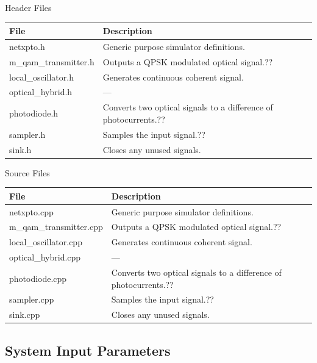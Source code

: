 Header Files
\begin{table}[H]
\centering
\begin{tabulary}{1.0\textwidth}{|L|L|}
\hline
\textbf{File}           & \textbf{Description}\\
\hline
netxpto.h               & Generic purpose simulator definitions.\\
\hline
m\_qam\_transmitter.h   & Outputs a QPSK modulated optical signal.??\\
\hline
local\_oscillator.h     & Generates continuous coherent signal.\\
\hline
optical\_hybrid.h       & ---\\
\hline
photodiode.h            & Converts two optical signals to a difference of photocurrents.??\\
\hline
sampler.h               & Samples the input signal.??\\
\hline
sink.h                  & Closes any unused signals.\\
\hline
\end{tabulary}
\end{table}
%
%
Source Files
\begin{table}[H]
\centering
\begin{tabulary}{1.0\textwidth}{|L|L|}
\hline
\textbf{File}                   & \textbf{Description}\\
\hline
netxpto.cpp                     & Generic purpose simulator definitions.\\
\hline
m\_qam\_transmitter.cpp         & Outputs a QPSK modulated optical signal.??\\
\hline
local\_oscillator.cpp           & Generates continuous coherent signal.\\
\hline
optical\_hybrid.cpp             & ---\\
\hline
photodiode.cpp                  & Converts two optical signals to a difference of photocurrents.??\\
\hline
sampler.cpp                     & Samples the input signal.??\\
\hline
sink.cpp                        & Closes any unused signals.\\
\hline
\end{tabulary}
\end{table}


\subsection*{System Input Parameters}

